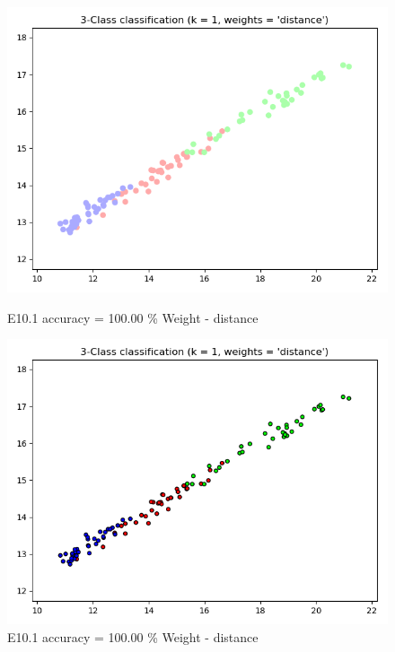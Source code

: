 \documentclass{classrep}
\begin{document}
\begin{figure}[H]
			\begin{minipage}{0.5\linewidth}
				\centering
				\includegraphics[scale=0.25]{KNN_seed_10_3.png}
				\caption{E10.1 accuracy = 100.00 \% Weight - distance}
				\label{E10.1}
			\end{minipage}
			\begin{minipage}{0.5\linewidth}
				\centering
				\includegraphics[scale=0.25]{KNN_seed_10_4.png}
				\caption{E10.1 accuracy = 100.00 \% Weight - distance}
				\label{E10.1}
			\end{minipage}
			\begin{minipage}{0.5\linewidth}
				\centering

\end{minipage}
\end{figure}
\end{document}
